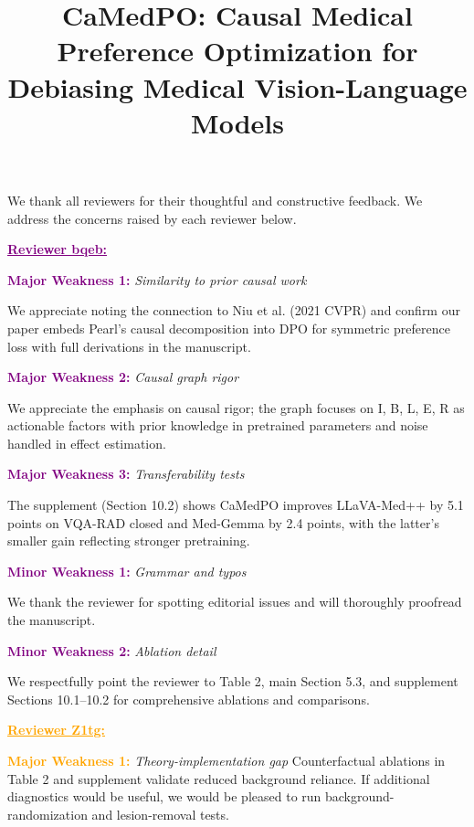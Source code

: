 \documentclass[10pt,twocolumn,letterpaper]{article}
\begin{document}
\title{CaMedPO: Causal Medical Preference Optimization for Debiasing Medical Vision-Language Models}  %

\maketitle
\thispagestyle{empty}
\appendix

\noindent
We thank all reviewers for their thoughtful and constructive feedback. We address the concerns raised by each reviewer below.

\noindent \textbf{\textcolor{purple}{\underline{Reviewer bqeb: }}}

\textcolor{purple}{\textbf{Major Weakness 1:}} \textit{Similarity to prior causal work}

We appreciate noting the connection to Niu et al. (2021 CVPR) and confirm our paper embeds Pearl's causal decomposition into DPO for symmetric preference loss with full derivations in the manuscript.

\textcolor{purple}{\textbf{Major Weakness 2:}} \textit{Causal graph rigor}

We appreciate the emphasis on causal rigor; the graph focuses on I, B, L, E, R as actionable factors with prior knowledge in pretrained parameters and noise handled in effect estimation.

\textcolor{purple}{\textbf{Major Weakness 3:}} \textit{Transferability tests}

The supplement (Section 10.2) shows CaMedPO improves LLaVA-Med++ by 5.1 points on VQA-RAD closed and Med-Gemma by 2.4 points, with the latter's smaller gain reflecting stronger pretraining.

\textcolor{purple}{\textbf{Minor Weakness 1:}} \textit{Grammar and typos}

We thank the reviewer for spotting editorial issues and will thoroughly proofread the manuscript.

\textcolor{purple}{\textbf{Minor Weakness 2:}} \textit{Ablation detail}

We respectfully point the reviewer to Table 2, main Section 5.3, and supplement Sections 10.1–10.2 for comprehensive ablations and comparisons.

\noindent \textbf{\textcolor{orange}{\underline{Reviewer Z1tg: }}}

\textcolor{orange}{\textbf{Major Weakness 1:}} \textit{Theory-implementation gap}
Counterfactual ablations in Table 2 and supplement validate reduced background reliance. If additional diagnostics would be useful, we would be pleased to run background-randomization and lesion-removal tests.
\end{document}
